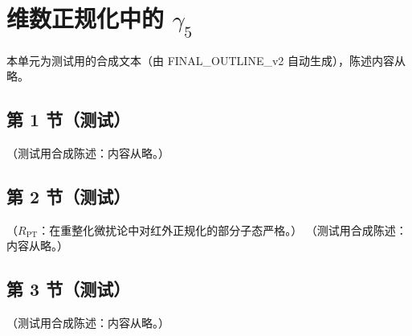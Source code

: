 \chapter{维数正规化中的 $\gamma_5$}\label{app:appI}
本单元为测试用的合成文本（由 FINAL\_OUTLINE\_v2 自动生成），陈述内容从略。

\section{第 1 节（测试）}\label{sec:appI-hvbm}

\begin{definition}[HVBM 方案]\label{def:appI-hvbm}
（测试用合成陈述：内容从略。）
\end{definition}

\section{第 2 节（测试）}\label{sec:appI-larin}

\begin{proposition}\label{prop:appI-larin}
（$R_{\mathrm{PT}}$：在重整化微扰论中对红外正规化的部分子态严格。）
（测试用合成陈述：内容从略。）
\end{proposition}

\section{第 3 节（测试）}\label{sec:appI-anomaly}

\begin{remark}[轴矢反常]\label{rem:appI-anomaly}
（测试用合成陈述：内容从略。）
\end{remark}
